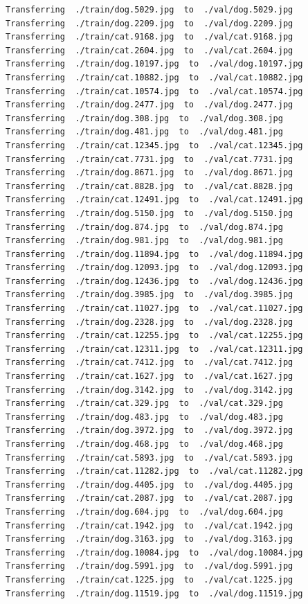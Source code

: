 \documentclass[]{book}
\theoremstyle{definition}
\theoremstyle{definition}
\theoremstyle{definition}
\theoremstyle{remark}
\begin{document}
\begin{verbatim}
Transferring  ./train/dog.5029.jpg  to  ./val/dog.5029.jpg
Transferring  ./train/dog.2209.jpg  to  ./val/dog.2209.jpg
Transferring  ./train/cat.9168.jpg  to  ./val/cat.9168.jpg
Transferring  ./train/cat.2604.jpg  to  ./val/cat.2604.jpg
Transferring  ./train/dog.10197.jpg  to  ./val/dog.10197.jpg
Transferring  ./train/cat.10882.jpg  to  ./val/cat.10882.jpg
Transferring  ./train/cat.10574.jpg  to  ./val/cat.10574.jpg
Transferring  ./train/dog.2477.jpg  to  ./val/dog.2477.jpg
Transferring  ./train/dog.308.jpg  to  ./val/dog.308.jpg
Transferring  ./train/dog.481.jpg  to  ./val/dog.481.jpg
Transferring  ./train/cat.12345.jpg  to  ./val/cat.12345.jpg
Transferring  ./train/cat.7731.jpg  to  ./val/cat.7731.jpg
Transferring  ./train/dog.8671.jpg  to  ./val/dog.8671.jpg
Transferring  ./train/cat.8828.jpg  to  ./val/cat.8828.jpg
Transferring  ./train/cat.12491.jpg  to  ./val/cat.12491.jpg
Transferring  ./train/dog.5150.jpg  to  ./val/dog.5150.jpg
Transferring  ./train/dog.874.jpg  to  ./val/dog.874.jpg
Transferring  ./train/dog.981.jpg  to  ./val/dog.981.jpg
Transferring  ./train/dog.11894.jpg  to  ./val/dog.11894.jpg
Transferring  ./train/dog.12093.jpg  to  ./val/dog.12093.jpg
Transferring  ./train/dog.12436.jpg  to  ./val/dog.12436.jpg
Transferring  ./train/dog.3985.jpg  to  ./val/dog.3985.jpg
Transferring  ./train/cat.11027.jpg  to  ./val/cat.11027.jpg
Transferring  ./train/dog.2328.jpg  to  ./val/dog.2328.jpg
Transferring  ./train/cat.12255.jpg  to  ./val/cat.12255.jpg
Transferring  ./train/cat.12311.jpg  to  ./val/cat.12311.jpg
Transferring  ./train/cat.7412.jpg  to  ./val/cat.7412.jpg
Transferring  ./train/cat.1627.jpg  to  ./val/cat.1627.jpg
Transferring  ./train/dog.3142.jpg  to  ./val/dog.3142.jpg
Transferring  ./train/cat.329.jpg  to  ./val/cat.329.jpg
Transferring  ./train/dog.483.jpg  to  ./val/dog.483.jpg
Transferring  ./train/dog.3972.jpg  to  ./val/dog.3972.jpg
Transferring  ./train/dog.468.jpg  to  ./val/dog.468.jpg
Transferring  ./train/cat.5893.jpg  to  ./val/cat.5893.jpg
Transferring  ./train/cat.11282.jpg  to  ./val/cat.11282.jpg
Transferring  ./train/dog.4405.jpg  to  ./val/dog.4405.jpg
Transferring  ./train/cat.2087.jpg  to  ./val/cat.2087.jpg
Transferring  ./train/dog.604.jpg  to  ./val/dog.604.jpg
Transferring  ./train/cat.1942.jpg  to  ./val/cat.1942.jpg
Transferring  ./train/dog.3163.jpg  to  ./val/dog.3163.jpg
Transferring  ./train/dog.10084.jpg  to  ./val/dog.10084.jpg
Transferring  ./train/dog.5991.jpg  to  ./val/dog.5991.jpg
Transferring  ./train/cat.1225.jpg  to  ./val/cat.1225.jpg
Transferring  ./train/dog.11519.jpg  to  ./val/dog.11519.jpg

\end{verbatim}
\end{document}
